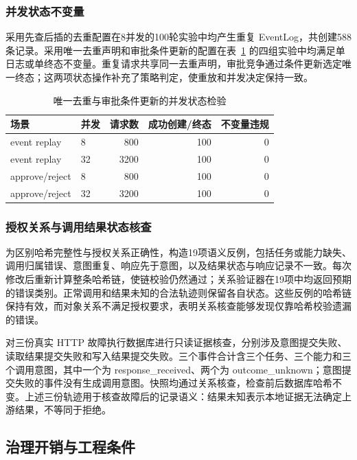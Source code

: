 \subsubsection{并发状态不变量}

采用先查后插的去重配置在8并发的100轮实验中均产生重复 EventLog，共创建588条记录。采用唯一去重声明和审批条件更新的配置在表~\ref{tab:concurrency-v11} 的四组实验中均满足单日志或单终态不变量。重复请求共享同一去重声明，审批竞争通过条件更新选定唯一终态；这两项状态操作补充了策略判定，使重放和并发决定保持一致。

\begin{table}[htbp]
\centering
\caption{唯一去重与审批条件更新的并发状态检验}
\label{tab:concurrency-v11}
\small
\begin{tabular}{llrrr}
\toprule
场景 & 并发 & 请求数 & 成功创建/终态 & 不变量违规 \\
\midrule
event replay & 8 & 800 & 100 & 0 \\
event replay & 32 & 3200 & 100 & 0 \\
approve/reject & 8 & 800 & 100 & 0 \\
approve/reject & 32 & 3200 & 100 & 0 \\
\bottomrule
\end{tabular}
\end{table}

\subsubsection{授权关系与调用结果状态核查}
\label{sec:evidence-rr022}

为区别哈希完整性与授权关系正确性，构造19项语义反例，包括任务或能力缺失、调用归属错误、意图重复、响应先于意图，以及结果状态与响应记录不一致。每次修改后重新计算整条哈希链，使链校验仍然通过；关系验证器在19项中均返回预期的错误类别。正常调用和结果未知的合法轨迹则保留各自状态。这些反例的哈希链保持有效，而对象关系不满足授权要求，表明关系核查能够发现仅靠哈希校验遗漏的错误。

对三份真实 HTTP 故障执行数据库进行只读证据核查，分别涉及意图提交失败、读取结果提交失败和写入结果提交失败。三个事件合计含三个任务、三个能力和三个调用意图，其中一个为 response\_received、两个为 outcome\_unknown；意图提交失败的事件没有生成调用意图。快照均通过关系核查，检查前后数据库哈希不变。上述三份轨迹用于核查故障后的记录语义：结果未知表示本地证据无法确定上游结果，不等同于拒绝。

\subsection{治理开销与工程条件}
\label{sec:engineering-rr022}

